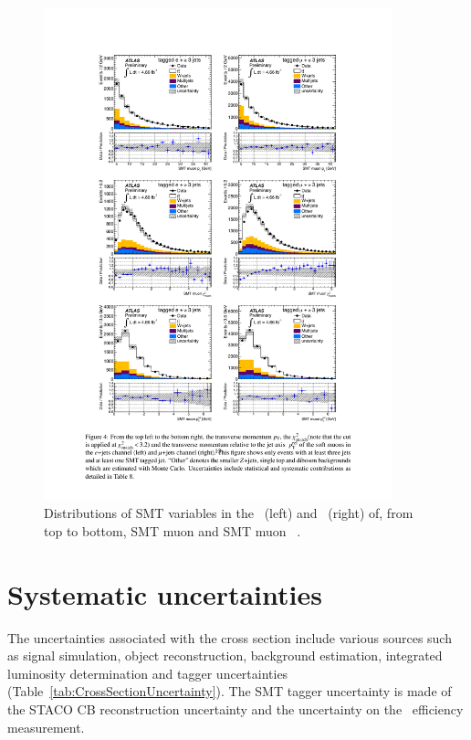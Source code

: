 \begin{figure}[htbp]
  \centering
    \includegraphics[width=0.90\textwidth]{PartCrossSection/Plots/h_stacks_elmu_SMT_pars.pdf}
    \caption{Distributions of SMT variables in the \ejets\ (left) and \mujets\ (right) of, from top to bottom, SMT muon \pt and SMT muon \xsd~\cite{Cross:SMTCrossSectionPaper}.}
  \label{fig:CrossBackgroundSMTShapes}
\end{figure}


\section{Systematic uncertainties} \label{sec:systematics_uncertainties}

The uncertainties associated with the cross section include various sources such as signal simulation, object reconstruction, background estimation, integrated luminosity determination and tagger uncertainties (Table~\ref{tab:CrossSectionUncertainty}). The SMT tagger uncertainty is made of the STACO CB reconstruction uncertainty and the uncertainty on the \xsm\ efficiency measurement. 

